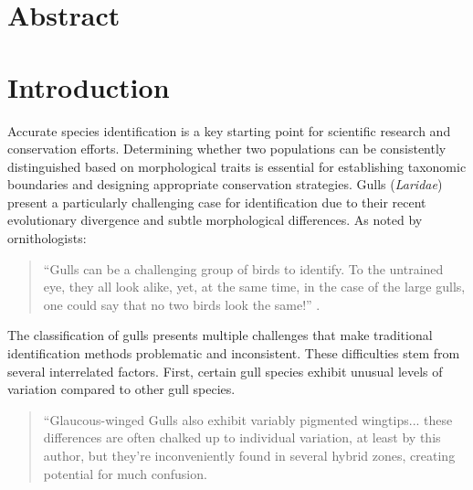 \documentclass[a4paper,12pt]{article}
\begin{document}
\newpage
\section*{\centering \normalsize{Abstract}}


\newpage
\tableofcontents

\newpage
\listoffigures

\newpage
\listoftables

\newpage
\cleardoublepage %
\setcounter{page}{1} %

\section{Introduction}
Accurate species identification is a key starting point for scientific research and conservation efforts. Determining whether two populations can be consistently distinguished based on morphological traits is essential for establishing taxonomic boundaries and designing appropriate conservation strategies. Gulls (\textit{Laridae}) present a particularly challenging case for identification due to their recent evolutionary divergence and subtle morphological differences. As noted by ornithologists:

\begin{quote}
    ``Gulls can be a challenging group of birds to identify. To the untrained eye, they all look alike, yet, at the same time, in the case of the large gulls, one could say that no two birds look the same!'' \citep{ayyash2024}.
\end{quote}


The classification of gulls presents multiple challenges that make traditional identification methods problematic and inconsistent. These difficulties stem from several interrelated factors. First, certain gull species exhibit unusual levels of variation compared to other gull species.

\begin{quote}
``Glaucous-winged Gulls also exhibit variably pigmented wingtips... these differences are often chalked up to individual
variation, at least by this author, but they're inconveniently found in several hybrid zones, creating potential for much
confusion.
\end{quote}
\end{document}
